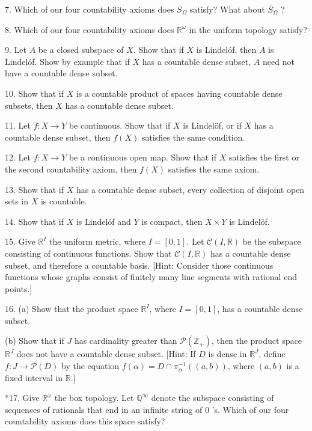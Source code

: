 7. Which of our four countability axioms does \(S_{\Omega }\) satisfy? What about \(\bar{S}_{\Omega }\) ?

8. Which of our four countability axioms does \(\mathbb{R}^{\omega }\) in the uniform topology satisfy?

9. Let \(A\) be a closed subspace of \(X\). Show that if \(X\) is Lindelóf, then \(A\) is Lindelóf. Show by example that if \(X\) has a countable dense subset, \(A\) need not have a countable dense subset.

10. Show that if \(X\) is a countable product of spaces having countable dense subsets, then \(X\) has a countable dense subset.

11. Let \(f : X \rightarrow Y\) be continuous. Show that if \(X\) is Lindelöf, or if \(X\) has a countable dense subset, then \(f( X)\) satisfies the same condition.

12. Let \(f : X \rightarrow Y\) be a continuous open map. Show that if \(X\) satisfies the first or the second countability axiom, then \(f( X)\) satisfies the same axiom.

13. Show that if \(X\) has a countable dense subset, every collection of disjoint open sets in \(X\) is countable.

14. Show that if \(X\) is Lindelöf and \(Y\) is compact, then \(X \times Y\) is Lindelöf.

15. Give \(\mathbb{R}^{I}\) the uniform metric, where \(I = [ {0,1}]\). Let \(\mathcal{C}( {I,\mathbb{R}})\) be the subspace consisting of continuous functions. Show that \(\mathcal{C}( {I,\mathbb{R}})\) has a countable dense subset, and therefore a countable basis. [Hint: Consider those continuous functions whose graphs consist of finitely many line segments with rational end points.]

16. (a) Show that the product space \(\mathbb{R}^{I}\), where \(I = [ {0,1}]\), has a countable dense subset.

(b) Show that if \(J\) has cardinality greater than \(\mathcal{P}( \mathbb{Z}_{ + })\), then the product space \(\mathbb{R}^{J}\) does not have a countable dense subset. [Hint: If \(D\) is dense in \(\mathbb{R}^{J}\), define \(f : J \rightarrow \mathcal{P}( D)\) by the equation \(f( \alpha ) = D \cap {\pi }_{\alpha }^{-1}( ( {a,b}) )\), where \((a, b)\) is a fixed interval in \(\mathbb{R}\).]

*17. Give \(\mathbb{R}^{\omega }\) the box topology. Let \( \mathbb{Q}^{\infty }\) denote the subspace consisting of sequences of rationals that end in an infinite string of 0 's. Which of our four countability axioms does this space satisfy?

